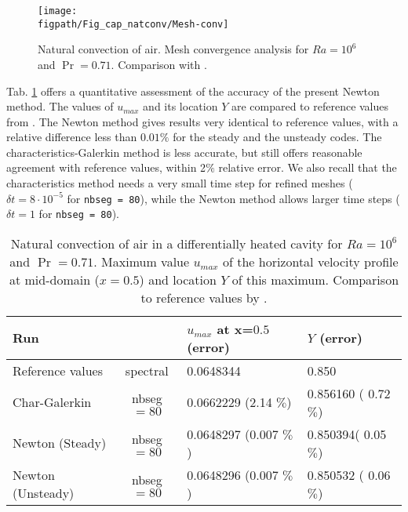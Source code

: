 \begin{figure}
	\begin{center}
		\texttt{[image: \\figpath/Fig\_cap\_natconv/Mesh-conv]} 
	\end{center}
	\caption{Natural convection of air. Mesh convergence analysis for $Ra=10^6$ and $\Pr = 0.71$. Comparison with \cite{LeQuere91}.}
	\label{fig-mesh-analysis}
\end{figure}


Tab. \ref{tab-valid-natconv} offers a quantitative assessment of the accuracy of the present Newton method. 
The values of $u_{max}$  and its location $Y$ are compared to reference values from \cite{LeQuere91}. 
The Newton method gives results very identical to reference values, with a relative difference less than $0.01 \%$ for the steady and the unsteady codes. 
The characteristics-Galerkin method is less accurate, but still offers reasonable agreement with reference values, within 2$\%$ relative error. 
We also recall that the characteristics method needs a very small time step for refined meshes ($\delta t = 8\cdot 10^{-5}$ for \texttt{nbseg = 80}), while the Newton method allows larger time steps ($\delta t = 1$ for \texttt{nbseg = 80}). %
\begin{table}%
	\begin{center}
		\begin{tabular}{|l|c|l|l|}
			\hline
			\multicolumn{2}{|l|}{Run} & $u_{max}$ at x=$0.5$ (error) & $Y$ (error) \\
			\hline
			Reference values & spectral & 0.0648344           & 0.850 \\ \hline
			Char-Galerkin       & nbseg$=80$ & 0.0662229 (2.14 $\%$) & 0.856160 ( 0.72 $\%$) \\ \hline
			Newton (Steady)        & nbseg$=80$ & 0.0648297 (0.007 $\%$) & 0.850394( 0.05 $\%$) \\ \hline
			Newton (Unsteady)        & nbseg$=80$ & 0.0648296 (0.007 $\%$) & 0.850532 ( 0.06 $\%$) \\ \hline
		\end{tabular}
	\end{center}
	\caption {Natural convection of air in a differentially heated cavity for $Ra = 10^6$ and $\Pr = 0.71$. Maximum value $u_{max}$ of the horizontal velocity profile at mid-domain ($x=0.5$) and location $Y$ of this maximum. Comparison to reference values by \cite{LeQuere91}.}
	\label{tab-valid-natconv}
\end{table}

